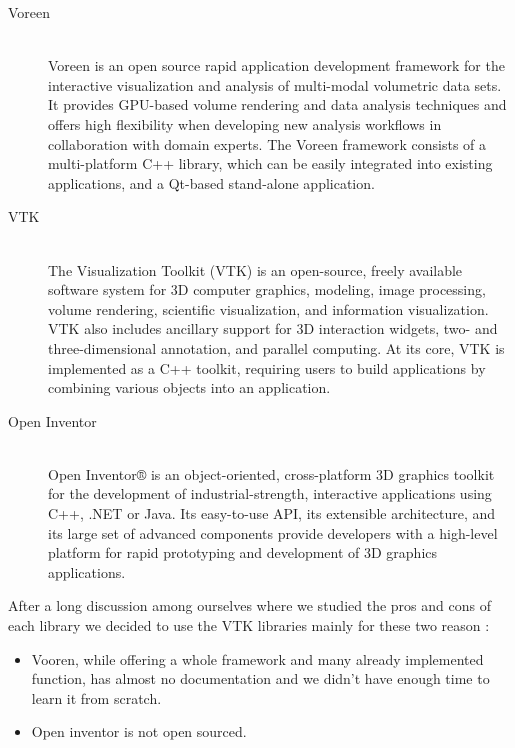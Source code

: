\documentclass[11pt]{article} %
\begin{document}
\begin{description}

\item[Voreen]\hfill \\ 
 Voreen is an open source rapid application development framework for the interactive visualization and analysis of multi-modal volumetric data sets. It provides GPU-based volume rendering and data analysis techniques and offers high flexibility when developing new analysis workflows in collaboration with domain experts. The Voreen framework consists of a multi-platform C++ library, which can be easily integrated into existing applications, and a Qt-based stand-alone application.
 \item[VTK] \hfill \\
The Visualization Toolkit (VTK) is an open-source, freely available software system for 3D computer graphics, modeling, image processing, volume rendering, scientific visualization, and information visualization. VTK also includes ancillary support for 3D interaction widgets, two- and three-dimensional annotation, and parallel computing. At its core, VTK is implemented as a C++ toolkit, requiring users to build applications by combining various objects into an application. 
 \item[Open Inventor] \hfill \\
Open Inventor® is an object-oriented, cross-platform 3D graphics toolkit for the development of industrial-strength, interactive applications using C++, .NET or Java.
Its easy-to-use API, its extensible architecture, and its large set of advanced components provide developers with a high-level platform for rapid prototyping and development of 3D graphics applications.

\end{description}

\noindent
After a long discussion among ourselves where we studied the pros and cons of each library we decided to use the VTK libraries mainly for these two reason :
\begin{itemize}
\item Vooren, while offering a whole framework and many already implemented function, has almost no documentation and we didn't have enough time to learn it from scratch. %
\item Open inventor is not open sourced. 
\end{itemize}

\end{document}
